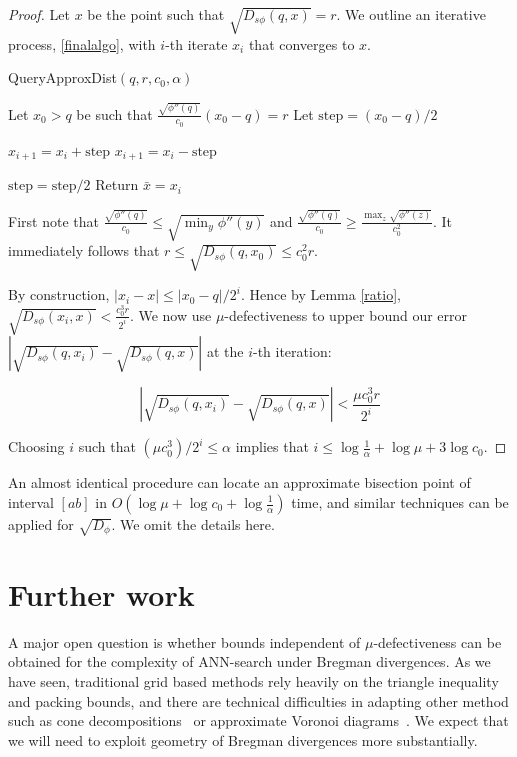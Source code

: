 \documentclass[11pt]{myclass}
\newcommand{\breg}{\ensuremath{D_\phi}}
\newcommand{\sbreg}{\ensuremath{D_{s\phi}}}
\begin{document}
\begin{proof} 
Let $x$ be the point such that $\sqrt{\sbreg(q,x)} = r$. We outline an iterative process,  \ref{finalalgo}, with $i$-th iterate $x_i$ that converges to $x$.
\begin{algorithm}
  \caption{QueryApproxDist$(q,r,c_0, \alpha)$}
  \begin{algorithmic}
    \STATE Let $x_0 > q$ be such that $\frac{\sqrt{\phi''(q)}}{c_0} (x_0 - q) = r$
	\STATE Let $\text{step} = (x_0 - q)/2$

    \REPEAT 
    	\IF{$\sqrt{\sbreg(q,x_i)} < r$}
			\STATE	$x_{i+1} = x_i + \text{step}$
		\ELSE 
			\STATE $ x_{i+1} = x_i- \text{step}$		
    	\ENDIF
		
		\STATE $\text{step} = \text{step}/2$
    \UNTIL {$|\sqrt{\sbreg(q,x_i)} - r| \leq \alpha r$}
    \STATE Return $\bar{x} = x_i$
  \end{algorithmic}
  \label{finalalgo}
\end{algorithm}
First note that $\frac{\sqrt{ \phi''(q)}}{c_0} \leq \sqrt{\min_y \phi''(y)}$ and 
$\frac{\sqrt{\phi''(q)}}{ c_0} \geq  \frac{\max_z \sqrt{\phi''(z)}} {c_0^2}$. It immediately follows that $r \leq\sqrt{\sbreg(q,x_0)} \leq c_0^2 r$.

By construction, $|x_i - x| \leq |x_0 - q|/2^i$. Hence by Lemma \ref{ratio}, $\sqrt{\sbreg(x_i,x)} < \frac {c_0 ^3 r}{2^i}$.  We now use $\mu$-defectiveness to upper bound our error $|\sqrt{\sbreg (q,x_i)} - \sqrt{\sbreg (q,x)}|$ at the $i$-th iteration:

\begin{equation}
\left|\sqrt{\sbreg (q,x_i)} - \sqrt{\sbreg (q,x)} \right | < \frac{\mu c_0^3 r}{2^i} 
\end{equation} 

Choosing $i$ such that $(\mu c_0^3)/2^i \leq \alpha$ implies that $i \leq \log \frac{1}{\alpha} +  \log \mu + 3 \log c_0$.\qedhere
\end{proof}
An almost identical procedure can locate an  approximate bisection point of interval $[ab]$ in $O(\log \mu + \log c_0 + \log \frac{1}{\alpha})$ time, and similar techniques can be applied for $\sqrt{\breg}$. We omit the details here.


\section{Further work}
A major open question is whether bounds independent of $\mu$-defectiveness can be obtained for the complexity of ANN-search under Bregman divergences. As we have seen, traditional grid based methods rely heavily on the triangle inequality and packing bounds, and there are technical difficulties in adapting other method such as cone decompositions~\cite{chanNN} or approximate Voronoi diagrams~\cite{plebs}. We expect that we will need to exploit geometry of Bregman divergences more substantially. 
\end{document}
